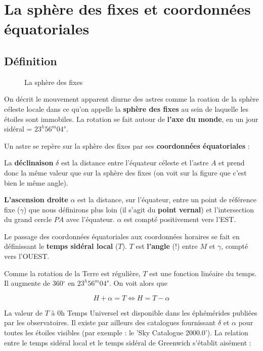 \documentclass[12pt]{report}
\begin{document}
\chapter{La sphère des fixes et coordonnées équatoriales}

\section{Définition}

\begin{figure}[ht]
\begin{center}
\end{center}
\caption{La sphère des fixes}
\label{fig:18}
\end{figure}

On décrit le mouvement apparent diurne des astres comme la roation de la sphère céleste locale dans ce qu'on appelle la \textbf{sphère des fixes} au sein de laquelle les étoiles sont immobiles. La rotation se fait autour de \textbf{l'axe du monde}, en un jour sidéral = $23^h56^m04^s$.

Un astre se repère sur la sphère des fixes par ses \textbf{coordonnées équatoriales} :

La \textbf{déclinaison} $\delta$ est la distance entre l'équateur céleste et l'astre $A$ et prend donc la même valeur que sur la sphère des fixes (on voit sur la figure que c'est bien le même angle).

\textbf{L'ascension droite} $\alpha$  est la distance, sur l'équateur, entre un point de référence fixe ($\gamma$) que nous définirons plus loin (il s'agit du \textbf{point vernal}) et l'intersection du grand cercle $PA$ avec l'équateur. $\alpha$ est compté positivement vers l'EST. 

Le passage des coordonnées équatoriales aux coordonnées horaires se fait en définissant le \textbf{temps sidéral local} ($T$). $T$ est \textbf{l'angle} (!) entre $M$ et $\gamma$, compté vers l'OUEST. 

Comme la rotation de la Terre est régulière, $T$ est une fonction linéaire du temps. Il augmente de 360$^\circ$ en $23^h56^m04^s$. On voit alors que

\begin{equation*}
H+\alpha = T \Leftrightarrow H = T-\alpha
\end{equation*}

La valeur de $T$ à 0h Temps Universel est disponible dans les éphémérides publiées par les observatoires. Il existe par ailleurs des catalogues fournissant $\delta$ et $\alpha$ pour toutes les étoiles visibles (par exemple : le 'Sky Catalogue 2000.0'). La relation entre le temps sidéral local et le temps sidéral de Greenwich s'établit aisément :
\end{document}
